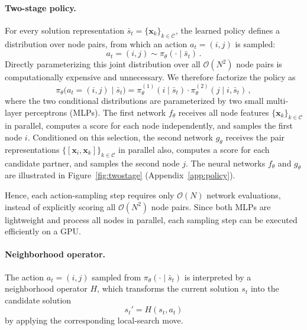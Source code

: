 \documentclass[letterpaper]{article} %
\begin{document}
\paragraph{Two-stage policy.}
For every solution representation $\bar{s}_t = \{\mathbf{x}_k\}_{k\in\mathcal C}$, the learned policy defines a distribution over node pairs, from which an action $a_t = (i,j)$ is sampled:
$$
a_t = (i,j) \sim \pi_\theta(\cdot \mid \bar{s}_t) \,.
$$
Directly parameterizing this joint distribution over all $\mathcal{O}(N^2)$ node pairs is computationally expensive and unnecessary. We therefore factorize the policy as
$$
\pi_\theta \big( a_t=(i,j)\mid\bar{s}_t \big)
=
\pi_\theta^{(1)}(i\mid\bar{s}_t)
\cdot
\pi_\theta^{(2)}(j\mid i,\bar{s}_t) \,,
$$
where the two conditional distributions are parameterized by two small multi-layer perceptrons (MLPs). The first network $f_\theta$ receives all node features $\{\mathbf{x}_k\}_{k\in\mathcal C}$ in parallel, computes a score for each node independently, and samples the first node $i$. Conditioned on this selection, the second network $g_\theta$ receives the pair representations $\{[\mathbf{x}_i,\mathbf{x}_k]\}_{k\in\mathcal C}$ in parallel also, computes a score for each candidate partner, and samples the second node $j$. The neural networks $f_\theta$ and $g_\theta$ are illustrated in Figure~\ref{fig:twostage} (Appendix~\ref{app:policy}).

Hence, each action-sampling step requires only $\mathcal{O}(N)$ network evaluations, instead of explicitly scoring all $\mathcal{O}(N^2)$ node pairs. Since both MLPs are lightweight and process all nodes in parallel, each sampling step can be executed efficiently on a GPU.



\paragraph{Neighborhood operator.}
The action $a_t=(i,j)$ sampled from $\pi_\theta(\cdot\mid\bar{s}_t)$ is interpreted by a neighborhood operator $H$, which transforms the current solution $s_t$ into the candidate solution 
$$
s_t' = H(s_t,a_t)
$$
by applying the corresponding local-search move. 

\end{document}
